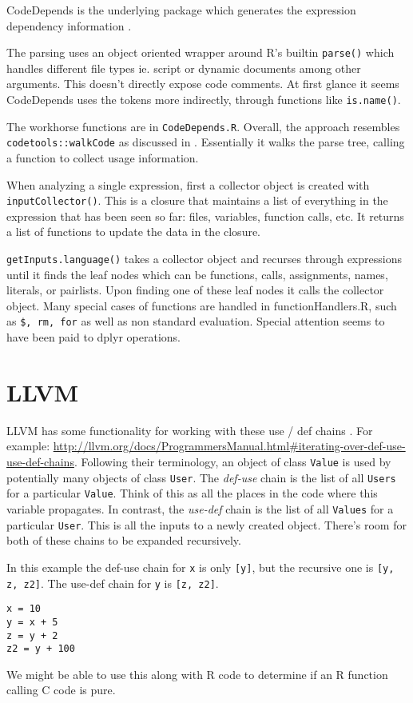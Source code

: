 \documentclass[12pt]{article}
\begin{document}
CodeDepends is the underlying package which generates the expression
dependency information \cite{R-CodeDepends}.

The parsing uses an object oriented wrapper around R's builtin \texttt{parse()}
which handles different file types ie. script or dynamic documents among other arguments.
This doesn't directly expose code comments.
At first glance it seems CodeDepends uses the tokens
more indirectly, through functions like \texttt{is.name()}. 

The workhorse functions are in \texttt{CodeDepends.R}. Overall, the
approach resembles \texttt{codetools::walkCode} as discussed in
\cite{chambers2016extending}. Essentially it walks the parse tree, calling
a function to collect usage information.

When analyzing a single expression, first a 
collector object is created with \texttt{inputCollector()}. This is a
closure that maintains a list of everything in the expression that has been seen
so far: files, variables, function calls, etc. It returns a list of
functions to update the data in the closure.

\texttt{getInputs.language()} takes a collector object and
recurses through expressions until it finds the leaf nodes which can be functions, calls, assignments,
names, literals, or pairlists. Upon finding one of these leaf nodes it
calls the collector object. 
Many special cases of functions are handled in functionHandlers.R, such as
\texttt{\$, rm, for} as well as non standard evaluation. Special attention seems
to have been paid to dplyr operations.


\section{LLVM}

LLVM has some functionality for working with these use / def chains
\cite{Lattner2004}. For example:
\url{http://llvm.org/docs/ProgrammersManual.html#iterating-over-def-use-use-def-chains}.
Following their terminology, an object of class \texttt{Value} is used by
potentially many objects of class \texttt{User}. The \emph{def-use} chain
is the list of all \texttt{Users} for a particular \texttt{Value}. Think
of this as all the places in the code where this variable propagates. In
contrast, the \emph{use-def} chain is the list of all \texttt{Values} for a
particular \texttt{User}. This is all the inputs to a newly
created object. There's room for both of these chains to be expanded recursively.

In this example the def-use chain for \texttt{x} is only \texttt{[y]}, but the
recursive one is \texttt{[y, z, z2]}. The use-def chain for \texttt{y} is
\texttt{[z, z2]}.

\begin{verbatim}
x = 10
y = x + 5
z = y + 2
z2 = y + 100
\end{verbatim}

We might be able to use this along with R code to determine if an R
function calling C code is pure.


 
\end{document}

